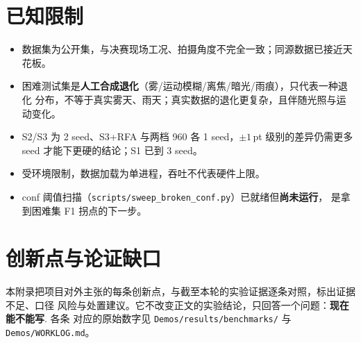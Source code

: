 \documentclass[UTF8,a4paper,11pt]{ctexart}
\begin{document}
\section{已知限制}

\begin{itemize}
  \item 数据集为公开集，与决赛现场工况、拍摄角度不完全一致；同源数据已接近天花板。
  \item 困难测试集是\textbf{人工合成退化}（雾/运动模糊/离焦/暗光/雨痕），只代表一种退化
        分布，不等于真实雾天、雨天；真实数据的退化更复杂，且伴随光照与运动变化。
  \item S2/S3 为 2 seed、S3+RFA 与两档 960 各 1 seed，$\pm1$\,pt 级别的差异仍需更多
        seed 才能下更硬的结论；S1 已到 3 seed。
  \item 受环境限制，数据加载为单进程，吞吐不代表硬件上限。
  \item conf 阈值扫描（\texttt{scripts/sweep\_broken\_conf.py}）已就绪但\textbf{尚未运行}，
        是拿到困难集 F1 拐点的下一步。
\end{itemize}

\clearpage
\appendix
\section{创新点与论证缺口}

本附录把项目对外主张的每条创新点，与截至本轮的实验证据逐条对照，标出证据不足、口径
风险与处置建议。它不改变正文的实验结论，只回答一个问题：\textbf{现在能不能写}. 各条
对应的原始数字见 \texttt{Demos/results/benchmarks/} 与 \texttt{Demos/WORKLOG.md}。
\end{document}
